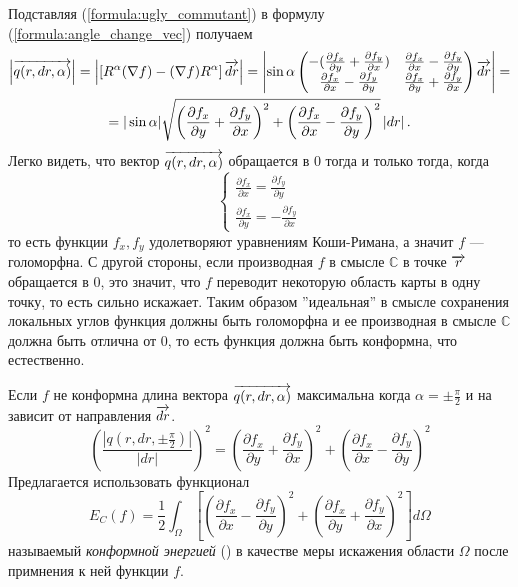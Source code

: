 Подставляя (\ref{formula:ugly_commutant}) в формулу (\ref{formula:angle_change_vec}) получаем
\begin{multline*} 
  \left| \overrightarrow{q(r, dr, \alpha)} \right| = 
  \left| \left[R^\alpha (\nabla f) - (\nabla f) R^\alpha \right] \overrightarrow{dr} \right| 
  = \left| \sin \alpha \begin{pmatrix}
    -(\frac{\partial f_x}{\partial y} + \frac{\partial f_y}{\partial x}) &
    \frac{\partial f_x}{\partial x} - \frac{\partial f_y}{\partial y} \\
    \frac{\partial f_x}{\partial x} - \frac{\partial f_y}{\partial y} &
    \frac{\partial f_x}{\partial y} + \frac{\partial f_y}{\partial x} 
  \end{pmatrix} \overrightarrow{dr} \right| = \\
  = |\sin \alpha| \sqrt{\left(\frac{\partial f_x}{\partial y} + \frac{\partial f_y}{\partial x}\right)^2 + \left(\frac{\partial f_x}{\partial x} - \frac{\partial f_y}{\partial y}\right)^2} \left| dr \right|.
\end{multline*}
Легко видеть, что вектор $\overrightarrow{q(r, dr, \alpha)}$ обращается в 0 тогда и только тогда, когда
$$\begin{cases}
  \frac{\partial f_x}{\partial x} = \frac{\partial f_y}{\partial y} \\
  \frac{\partial f_x}{\partial y} = -\frac{\partial f_y}{\partial x} 
\end{cases}$$
то есть функции $f_x, f_y$ удолетворяют уравнениям Коши-Римана, а значит $f$ --- голоморфна. 
С другой стороны, если производная $f$ в смысле $\mathbb{C}$ в точке $\overrightarrow{r}$ обращается в 0, это значит, что
$f$ переводит некоторую область карты в одну точку, то есть сильно искажает. Таким образом ''идеальная'' в
смысле сохранения локальных углов функция должны быть голоморфна и ее производная в смысле $\mathbb{C}$ должна
быть отлична от 0, то есть функция должна быть конформна, что естественно.

Если $f$ не конформна длина вектора $\overrightarrow{q(r, dr, \alpha)}$ максимальна когда $\alpha = \pm \frac{\pi}{2}$ 
и на зависит от направления $\overrightarrow{dr}$. 
\begin{equation*}
  \left(\frac{\left| {q(r, dr, \pm \frac{\pi}{2})} \right|}{|dr|}\right)^2 = 
  \left(\frac{\partial f_x}{\partial y} + \frac{\partial f_y}{\partial x}\right)^2 + 
  \left(\frac{\partial f_x}{\partial x} - \frac{\partial f_y}{\partial y}\right)^2 
\end{equation*}
Предлагается использовать функционал 
\begin{equation}
\label{formula:EC_Def}
  E_C(f) = \frac{1}{2} \int_{\Omega}\left[{ 
    \left(\frac{\partial f_x}{\partial x} - \frac{\partial f_y}{\partial y}\right)^2 + 
    \left(\frac{\partial f_x}{\partial y} + \frac{\partial f_y}{\partial x}\right)^2} \right] d\Omega   
\end{equation}
называемый \textit{конформной энергией} (\cite{Polthier}) в качестве меры искажения области $\Omega$ после
примнения к ней функции $f$. 

